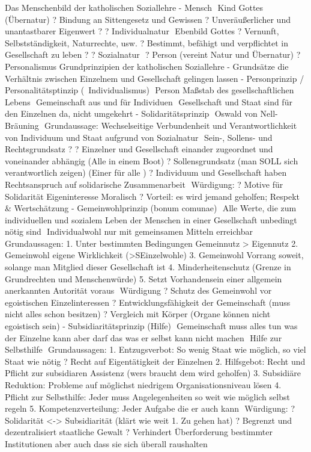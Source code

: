 \documentclass[11pt, paper=a4, twocolumn]{scrartcl}
\begin{document}
Das Menschenbild der katholischen Soziallehre
-	Mensch
	Kind Gottes (Übernatur)
?	Bindung an Sittengesetz und Gewissen
?	Unveräußerlicher und unantastbarer Eigenwert
?	? Individualnatur
	Ebenbild Gottes
?	Vernunft, Selbstständigkeit, Naturrechte, usw.
?	Bestimmt, befähigt und verpflichtet in Gesellschaft zu leben
?	? Sozialnatur
	? Person (vereint Natur und Übernatur) ? Personalismus
Grundprinzipien der katholischen Soziallehre
-	Grundsätze die Verhältnis zwischen Einzelnem und Gesellschaft gelingen lassen
-	Personprinzip / Personalitätsptinzip (~Individualismus)
	Person Maßstab des gesellschaftlichen Lebens
	Gemeinschaft aus und für Individuen
	Gesellschaft und Staat sind für den Einzelnen da, nicht umgekehrt
-	Solidaritätsprinzip
	Oswald von Nell-Bräuning
	Grundaussage: Wechselseitige Verbundenheit und Verantwortlichkeit von Individuum und Staat aufgrund von Sozialnatur
	Sein-, Sollens- und Rechtsgrundsatz
?	? Einzelner und Gesellschaft einander zugeordnet und voneinander abhängig
(Alle in einem Boot)
?	Sollensgrundsatz (man SOLL sich verantwortlich zeigen)
(Einer für alle )
?	Individuum und Gesellschaft haben Rechtsanspruch auf solidarische Zusammenarbeit
	Würdigung:
?	Motive für Solidarität
     Eigeninteresse
     Moralisch
?	Vorteil: es wird jemand geholfen; Respekt & Wertschätzung
-	Gemeinwohlprinzip (bonum comunae)
	Alle Werte, die zum individuellen und sozialem Leben der Menschen in einer Gesellschaft unbedingt nötig sind
	Individualwohl nur mit gemeinsamen Mitteln erreichbar
	Grundaussagen:
1.	Unter bestimmten Bedingungen Gemeinnutz > Eigennutz
2.	Gemeinwohl eigene Wirklichkeit (>SEinzelwohle)
3.	Gemeinwohl Vorrang soweit, solange man Mitglied dieser Gesellschaft ist
4.	Minderheitenschutz (Grenze in Grundrechten und Menschenwürde)
5.	Setzt Vorhandensein einer allgemein anerkannten Autorität voraus
	Würdigung
?	Schutz des Gemeinwohl vor egoistischen Einzelinteressen
?	Entwicklungsfähigkeit der Gemeinschaft (muss nicht alles schon besitzen)
?	Vergleich mit Körper (Organe können nicht egoistisch sein)
-	Subsidiaritätsprinzip (Hilfe)
	Gemeinschaft muss alles tun was der Einzelne kann aber darf das was er selbst kann nicht machen
	Hilfe zur Selbsthilfe
	Grundaussagen:
1.	Entzugsverbot: So wenig Staat wie möglich, so viel Staat wie nötig ? Recht auf Eigentätigkeit der Einzelnen
2.	Hilfsgebot: Recht und Pflicht zur subsidiaren Assistenz (wers braucht dem wird geholfen)
3.	Subsidiäre Reduktion: Probleme auf möglichst niedrigem Organisationsniveau lösen
4.	Pflicht zur Selbsthilfe: Jeder muss Angelegenheiten so weit wie möglich selbst regeln
5.	Kompetenzverteilung: Jeder Aufgabe die er auch kann
	Würdigung:
?	Solidarität <-> Subsidiarität (klärt wie weit 1. Zu gehen hat)
?	Begrenzt und dezentralisiert staatliche Gewalt
?	Verhindert Überforderung bestimmter Institutionen aber auch dass sie sich überall raushalten
\end{document}
